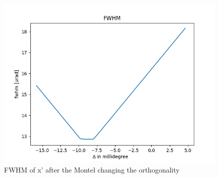 \begin{figure}
%
\centering
%
\includegraphics[width=.68\textwidth]{Immagini/Chapter4/FWHM}
%
\caption{FWHM of x' after the Montel changing the orthogonality}
%
\label{fig:FWHM changing orthogonality}
%
\end{figure}
